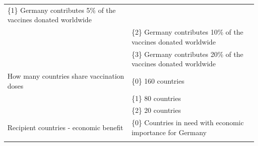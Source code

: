 \documentclass[12pt,oneside,smallheadings,chapterprefix=true]{article}
\begin{document}
\begin{longtable}[]{@{}ll@{}}
\begin{minipage}[t]{0.54\columnwidth}
\{1\} Germany contributes 5\% of the vaccines donated worldwide\strut
\end{minipage}\tabularnewline
\begin{minipage}[t]{0.40\columnwidth}\raggedright
\strut
\end{minipage} & \begin{minipage}[t]{0.54\columnwidth}\raggedright
\{2\} Germany contributes 10\% of the vaccines donated worldwide\strut
\end{minipage}\tabularnewline
\begin{minipage}[t]{0.40\columnwidth}\raggedright
\strut
\end{minipage} & \begin{minipage}[t]{0.54\columnwidth}\raggedright
\{3\} Germany contributes 20\% of the vaccines donated worldwide\strut
\end{minipage}\tabularnewline
\begin{minipage}[t]{0.40\columnwidth}\raggedright
How many countries share vaccination doses\strut
\end{minipage} & \begin{minipage}[t]{0.54\columnwidth}\raggedright
\{0\} 160 countries\strut
\end{minipage}\tabularnewline
\begin{minipage}[t]{0.40\columnwidth}\raggedright
\strut
\end{minipage} & \begin{minipage}[t]{0.54\columnwidth}\raggedright
\{1\} 80 countries\strut
\end{minipage}\tabularnewline
\begin{minipage}[t]{0.40\columnwidth}\raggedright
\strut
\end{minipage} & \begin{minipage}[t]{0.54\columnwidth}\raggedright
\{2\} 20 countries\strut
\end{minipage}\tabularnewline
\begin{minipage}[t]{0.40\columnwidth}\raggedright
Recipient countries - economic benefit\strut
\end{minipage} & \begin{minipage}[t]{0.54\columnwidth}\raggedright
\{0\} Countries in need with economic importance for Germany\strut
\end{minipage}\tabularnewline
\begin{minipage}[t]{0.40\columnwidth}\raggedright
\strut
\end{minipage} & \begin{minipage}[t]{0.54\columnwidth}\raggedright

\end{minipage}
\end{longtable}
\end{document}
